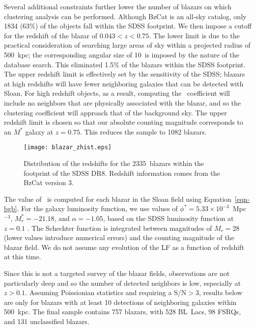 \documentclass[useAMS,usenatbib]{mn2e}
\begin{document}
Several additional constraints further lower the number of blazars on which clustering analysis can be performed. Although BzCat is an all-sky catalog, only 1834 (63\%) of the objects fall within the SDSS footprint. We then impose a cutoff for the redshift of the blazar of $0.043<z<0.75$. The lower limit is due to the practical consideration of searching large areas of sky within a projected radius of 500~kpc; the corresponding angular size of 10\arcmin~is imposed by the nature of the database search. This eliminated 1.5\% of the blazars within the SDSS footprint. The upper redshift limit is effectively set by the sensitivity of the SDSS; blazars at high redshifts will have fewer neighboring galaxies that can be detected with Sloan. For high redshift objects, as a result, computing the \bgb~coefficient will include no neighbors that are physically associated with the blazar, and so the clustering coefficient will approach that of the background sky. The upper redshift limit is chosen so that our absolute counting magnitude corresponds to an $M^*$ galaxy at $z=0.75$. This reduces the sample to 1082 blazars. 

\begin{figure}
\texttt{[image: blazar\_zhist.eps]}
\caption{Distribution of the redshifts for the 2335~blazars within the footprint of the SDSS DR8. Redshift information comes from the BzCat version 3.  
\label{fig-blazar_zhist}}
\end{figure}

The value of \bgb~is computed for each blazar in the Sloan field using Equation~\ref{eqn-bgb}. For the galaxy luminosity function, we use values of $\phi^*=5.33\times10^{-3}$~Mpc$^{-3}$, $M_r^*=-21.18$, and $\alpha=-1.05$, based on the SDSS luminosity function at $z=0.1$ \citep{bla03a}. The Schechter function is integrated between magnitudes of $M_r=28$ (lower values introduce numerical errors) and the counting magnitude of the blazar field. We do not assume any evolution of the LF as a function of redshift at this time.

Since this is not a targeted survey of the blazar fields, observations are not particularly deep and so the number of detected neighbors is low, especially at $z>0.1$. Assuming Poissionian statistics and requiring a S/N$>3$, results below are only for blazars with at least 10 detections of neighboring galaxies within 500~kpc. The final sample contains 757 blazars, with 528 BL~Lacs, 98 FSRQs, and 131 unclassified blazars. 


\end{document}

